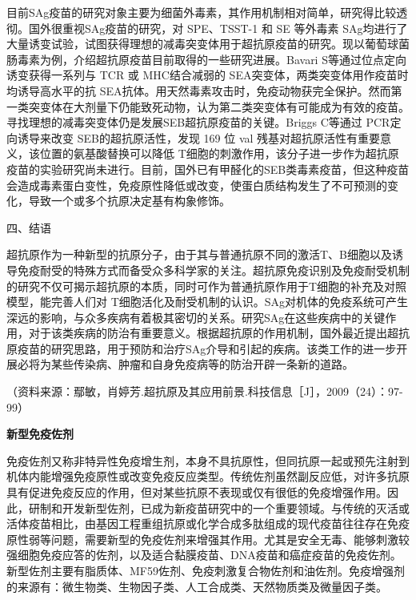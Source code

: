 目前SAg疫苗的研究对象主要为细菌外毒素，其作用机制相对简单，研究得比较透彻。国外很重视SAg疫苗的研究，对
SPE、TSST-1 和 SE 等外毒素
SAg均进行了大量诱变试验，试图获得理想的减毒突变体用于超抗原疫苗的研究。现以葡萄球菌肠毒素为例，介绍超抗原疫苗目前取得的一些研究进展。Bavari
S等通过位点定向诱变获得一系列与 TCR 或 MHC结合减弱的
SEA突变体，两类突变体用作疫苗时均诱导高水平的抗
SEA抗体。用天然毒素攻击时，免疫动物获完全保护。然而第一类突变体在大剂量下仍能致死动物，认为第二类突变体有可能成为有效的疫苗。寻找理想的减毒突变体仍是发展SEB超抗原疫苗的关键。Briggs
C等通过 PCR定向诱导来改变 SEB的超抗原活性，发现 169 位 val
残基对超抗原活性有重要意义，该位置的氨基酸替换可以降低
T细胞的刺激作用，该分子进一步作为超抗原疫苗的实验研究尚未进行。目前，国外已有甲醛化的SEB类毒素疫苗，但这种疫苗会造成毒素蛋白变性，免疫原性降低或改变，使蛋白质结构发生了不可预测的变化，导致一个或多个抗原决定基有构象修饰。


\begin{center}
    {\large 四、结语}
\end{center}

超抗原作为一种新型的抗原分子，由于其与普通抗原不同的激活T、B细胞以及诱导免疫耐受的特殊方式而备受众多科学家的关注。超抗原免疫识别及免疫耐受机制的研究不仅可揭示超抗原的本质，同时可作为普通抗原作用于T细胞的补充及对照模型，能完善人们对
T细胞活化及耐受机制的认识。SAg对机体的免疫系统可产生深远的影响，与众多疾病有着极其密切的关系。研究SAg在这些疾病中的关键作用，对于该类疾病的防治有重要意义。根据超抗原的作用机制，国外最近提出超抗原疫苗的研究思路，用于预防和治疗SAg介导和引起的疾病。该类工作的进一步开展必将为某些传染病、肿瘤和自身免疫病等的防治开辟一条新的道路。

（资料来源：鄢敏，肖婷芳.超抗原及其应用前景.科技信息［J］，2009（24）：97-99）

\begin{center}
    \textbf{\Large 新型免疫佐剂}
\end{center}

免疫佐剂又称非特异性免疫增生剂，本身不具抗原性，但同抗原一起或预先注射到机体内能增强免疫原性或改变免疫反应类型。传统佐剂虽然副反应低，对许多抗原具有促进免疫反应的作用，但对某些抗原不表现或仅有很低的免疫增强作用。因此，研制和开发新型佐剂，已成为新疫苗研究中的一个重要领域。与传统的灭活或活体疫苗相比，由基因工程重组抗原或化学合成多肽组成的现代疫苗往往存在免疫原性弱等问题，需要新型的免疫佐剂来增强其作用。尤其是安全无毒、能够刺激较强细胞免疫应答的佐剂，以及适合黏膜疫苗、DNA疫苗和癌症疫苗的免疫佐剂。新型佐剂主要有脂质体、MF59佐剂、免疫刺激复合物佐剂和油佐剂。免疫增强剂的来源有：微生物类、生物因子类、人工合成类、天然物质类及微量因子类。


